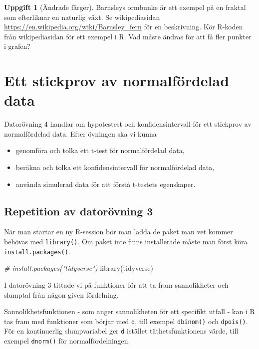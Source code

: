 \documentclass[
]{book}
\newenvironment{Shaded}{\begin{snugshade}}{\end{snugshade}}
\newcommand{\CommentTok}[1]{\textcolor[rgb]{0.56,0.35,0.01}{\textit{#1}}}
\newcommand{\FunctionTok}[1]{\textcolor[rgb]{0.00,0.00,0.00}{#1}}
\newcommand{\NormalTok}[1]{#1}
\theoremstyle{definition}
\theoremstyle{definition}
\theoremstyle{definition}
\newtheorem{exercise}{Uppgift}[chapter]
\theoremstyle{definition}
\theoremstyle{remark}
\begin{document}
\begin{exercise}[Ändrade färger]
Barnsleys ormbunke är ett exempel på en fraktal som efterliknar en naturlig växt. Se wikipediasidan \url{https://en.wikipedia.org/wiki/Barnsley_fern} för en beskrivning. Kör R-koden från wikipediasidan för ett exempel i R. Vad måste ändras för att få fler punkter i grafen?
\end{exercise}

\hypertarget{ett-stickprov-av-normalfuxf6rdelad-data}{%
\chapter{Ett stickprov av normalfördelad data}\label{ett-stickprov-av-normalfuxf6rdelad-data}}

Datorövning 4 handlar om hypotestest och konfidensintervall för ett stickprov av normalfördelad data. Efter övningen ska vi kunna

\begin{itemize}
\item
  genomföra och tolka ett t-test för normalfördelad data,
\item
  beräkna och tolka ett konfidensintervall för normalfördelad data,
\item
  använda simulerad data för att förstå t-testets egenskaper.
\end{itemize}

\hypertarget{repetition-av-datoruxf6vning-3}{%
\section{Repetition av datorövning 3}\label{repetition-av-datoruxf6vning-3}}

När man startar en ny R-session bör man ladda de paket man vet kommer behövas med \texttt{library()}. Om paket inte finns installerade måste man först köra \texttt{install.packages()}.

\begin{Shaded}
\begin{Highlighting}[]
\CommentTok{\# install.packages("tidyverse")}
\FunctionTok{library}\NormalTok{(tidyverse)}
\end{Highlighting}
\end{Shaded}

I datorövning 3 tittade vi på funktioner för att ta fram sannolikheter och slumptal från någon given fördelning.

Sannolikhetsfunktionen - som anger sannolikheten för ett specifikt utfall - kan i R tas fram med funktioner som börjar med \texttt{d}, till exempel \texttt{dbinom()} och \texttt{dpois()}. För en kontinuerlig slumpvariabel ger \texttt{d} istället täthetsfunktionens värde, till exempel \texttt{dnorm()} för normalfördelningen.
\end{document}
